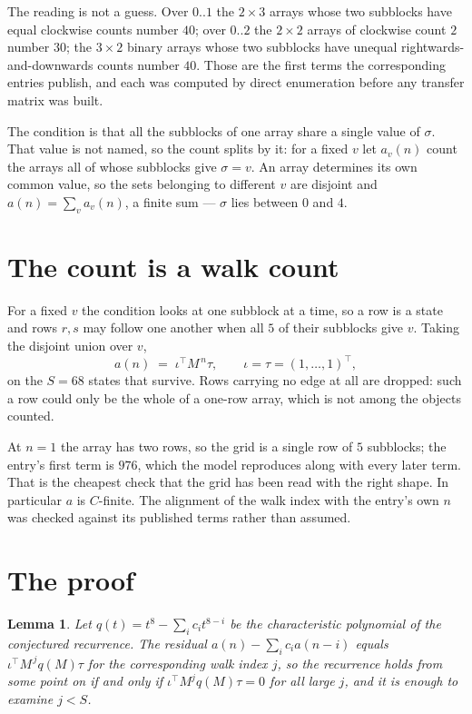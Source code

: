 \documentclass[11pt,a4paper]{article}
\theoremstyle{plain}
\newtheorem{lemma}[theorem]{Lemma}
\theoremstyle{definition}
\begin{document}
The reading is not a guess. Over $0..1$ the $2\times3$ arrays whose two subblocks have equal
clockwise counts number $40$; over $0..2$ the $2\times2$ arrays of clockwise count $2$ number
$30$; the $3\times2$ binary arrays whose two subblocks have unequal rightwards-and-downwards
counts number $40$. Those are the first terms the corresponding entries publish, and each was
computed by direct enumeration before any transfer matrix was built.

The condition is that all the subblocks of one array share a single value of $\sigma$. That
value is not named, so the count splits by it: for a fixed $v$ let $a_v(n)$ count the arrays all
of whose subblocks give $\sigma=v$. An array determines its own common value, so the sets
belonging to different $v$ are disjoint and $a(n)=\sum_v a_v(n)$, a finite sum --- $\sigma$
lies between $0$ and $4$.

\section{The count is a walk count}

For a fixed $v$ the condition looks at one subblock at a time, so a row is
a state and rows $r,s$ may follow one another when all $5$ of their subblocks give $v$.
Taking the disjoint union over $v$,
\[
a(n)\;=\;\iota^{\!\top}M^{\,n}\tau,\qquad\iota=\tau=(1,\dots,1)^{\!\top},
\]
on the $S=68$ states that survive. Rows carrying no edge at all are dropped: such a row could
only be the whole of a one-row array, which is not among the objects counted.

At $n=1$ the array has two rows, so the grid is a single row of $5$
subblocks; the entry's first term is $976$, which the model
reproduces along with every later term. That is the cheapest check that the grid has been read
with the right shape.
In particular $a$ is $C$-finite. The alignment of the walk index with the entry's own $n$ was
checked against its published terms rather than assumed.

\section{The proof}

\begin{lemma}\label{lem:crit}
Let $q(t)=t^{8}-\sum_i c_it^{8-i}$ be the characteristic polynomial of the
conjectured recurrence. The residual $a(n)-\sum_ic_ia(n-i)$ equals
$\iota^{\!\top}M^{\,j}q(M)\tau$ for the corresponding walk index $j$, so the recurrence
holds from some point on if and only if $\iota^{\!\top}M^{j}q(M)\tau=0$ for all large $j$,
and it is enough to examine $j<S$.
\end{lemma}
\end{document}
